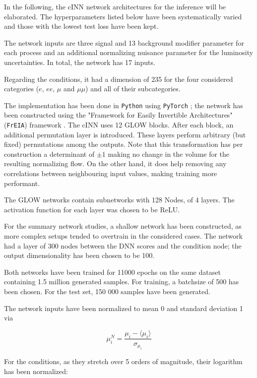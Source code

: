 
In the following, the cINN network architectures for the inference will be elaborated. The hyperparameters listed below have been systematically varied and those with the lowest test loss have been kept.

The network inputs are three signal and 13 background modifier parameter for each process and an additional normalizing nuisance parameter for the luminosity uncertainties. In total, the network has 17 inputs.

Regarding the conditions, it had a dimension of 235 for the four considered categories ($e$, $ee$, $\mu$ and $\mu\mu$) and all of their subcategories.

The implementation has been done in \texttt{Python} using \texttt{PyTorch} \cite{pytorch}; the network has been constructed using the "Framework for Easily Invertible Architectures" (\texttt{FrEIA}) framework \cite{freia}. The cINN uses 12 GLOW blocks. After each block, an additional permutation layer is introduced. These layers perform arbitrary (but fixed) permutations among the outputs. Note that this transformation has per construction a determinant of $\pm1$ making no change in the volume for the resulting normalizing flow. On the other hand, it does help removing any correlations between neighbouring input values, making training more performant.

The GLOW networks contain subnetworks with 128 Nodes, of 4 layers. The activation function for each layer was chosen to be ReLU.

For the summary network studies, a shallow network has been constructed, as more complex setups tended to overtrain in the considered cases. The network had a layer of 300 nodes between the DNN scores and the condition node; the output dimensionality has been chosen to be 100.

Both networks have been trained for 11000 epochs on the same dataset containing 1.5 million generated samples. For training, a batchsize of 500 has been chosen. For the test set, 150 000 samples have been generated.

The network inputs have been normalized to mean 0 and standard deviation 1 via

\begin{equation*}
	\mu^N_i = \frac{\mu_i - \langle\mu_i\rangle}{\sigma_{\mu_i}}
\end{equation*}

For the conditions, as they stretch over 5 orders of magnitude, their logarithm has been normalized:

